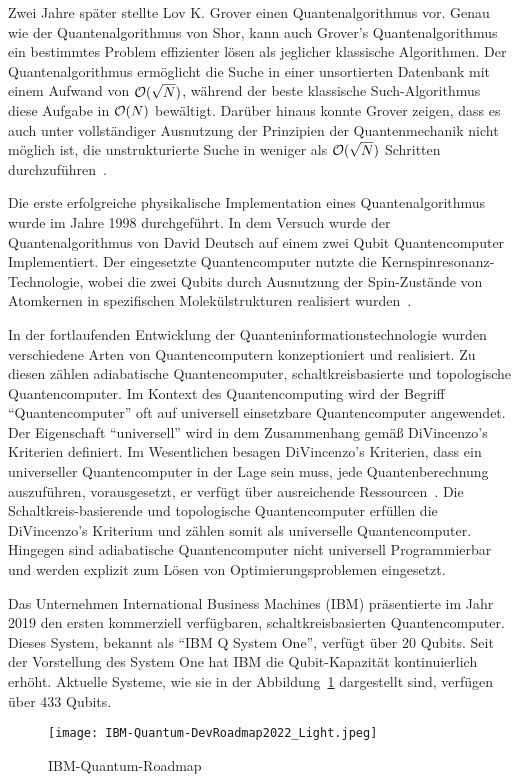 Zwei Jahre später stellte Lov K. Grover einen Quantenalgorithmus vor.
Genau wie der Quantenalgorithmus von Shor, kann auch Grover's Quantenalgorithmus ein bestimmtes Problem effizienter lösen  als jeglicher klassische Algorithmen.
Der Quantenalgorithmus ermöglicht die Suche in einer unsortierten Datenbank mit einem Aufwand von \(\operatorname{\mathcal{O}}(\sqrt N)\), 
während der beste klassische Such-Algorithmus diese Aufgabe in \(\operatorname{\mathcal{O}}(N)\) bewältigt. 
Darüber hinaus konnte Grover zeigen, 
dass es auch unter vollständiger Ausnutzung der Prinzipien der Quantenmechanik nicht möglich ist, 
die unstrukturierte Suche in weniger als \(\operatorname{\mathcal{O}}(\sqrt N)\) Schritten durchzuführen~\cite{grover1996fast}.

Die erste erfolgreiche physikalische Implementation eines Quantenalgorithmus wurde im Jahre 1998 durchgeführt.
In dem Versuch wurde der Quantenalgorithmus von David Deutsch auf einem zwei Qubit Quantencomputer Implementiert.
Der eingesetzte Quantencomputer nutzte die Kernspinresonanz-Technologie, 
wobei die zwei Qubits durch Ausnutzung der Spin-Zustände von Atomkernen in spezifischen Molekülstrukturen realisiert wurden~\cite{Jones_1998}.

In der fortlaufenden Entwicklung der Quanteninformationstechnologie wurden verschiedene Arten von Quantencomputern konzeptioniert und realisiert.
Zu diesen zählen adiabatische Quantencomputer, schaltkreisbasierte und topologische Quantencomputer.
Im Kontext des Quantencomputing wird der Begriff "`Quantencomputer"' oft auf universell einsetzbare Quantencomputer angewendet.
Der Eigenschaft "`universell"' wird in dem Zusammenhang gemäß DiVincenzo's Kriterien definiert. 
Im Wesentlichen besagen DiVincenzo's Kriterien, dass ein universeller Quantencomputer in der Lage sein muss, jede Quantenberechnung auszuführen, vorausgesetzt, er verfügt über ausreichende Ressourcen~\cite{DiVincenzo_2000}.
Die Schaltkreis-basierende und topologische Quantencomputer erfüllen die DiVincenzo's Kriterium und zählen somit als universelle Quantencomputer.
Hingegen sind adiabatische Quantencomputer nicht universell Programmierbar und werden explizit zum Lösen von Optimierungsproblemen eingesetzt.

Das Unternehmen International Business Machines (IBM) präsentierte im Jahr 2019 den ersten kommerziell verfügbaren, schaltkreisbasierten Quantencomputer.
Dieses System, bekannt als "`IBM Q System One"', verfügt über 20 Qubits.
Seit der Vorstellung des System One hat IBM die Qubit-Kapazität kontinuierlich erhöht. 
Aktuelle Systeme, wie sie in der Abbildung~\ref{fig:IBM-Quantum-DevRoadmap2022} dargestellt sind, verfügen über 433 Qubits.
\begin{figure}
\caption{IBM-Quantum-Roadmap~\cite{IBM_2023}}
\label{fig:IBM-Quantum-DevRoadmap2022}
\texttt{[image: IBM-Quantum-DevRoadmap2022\_Light.jpeg]}
\centering
\end{figure}

